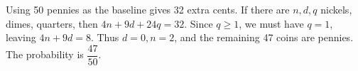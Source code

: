 Using 50 pennies as the baseline gives 32 extra cents. If there are $n,d,q$ nickels, dimes, quarters, then $4n+9d+24q=32$. Since $q\ge1$, we must have $q=1$, leaving $4n+9d=8$. Thus $d=0,n=2$, and the remaining 47 coins are pennies. The probability is $\boxed{\dfrac{47}{50}}$.
